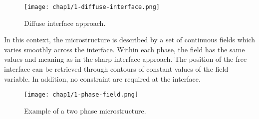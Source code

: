     \begin{figure}[H]
        \centering
        \texttt{[image: chap1/1-diffuse-interface.png]}
        \caption{Diffuse interface approach.}
        \label{fig:1-diffuse-interface}
    \end{figure}
    In this context, the microstructure is described by a set of continuous fields which varies smoothly across the interface. Within each phase, the field has the same values and meaning as in the sharp interface approach. The position of the free interface can be retrieved through contours of constant values of the field variable. In addition, no constraint are required at the interface.
    \begin{figure}[H]
        \centering
        \texttt{[image: chap1/1-phase-field.png]}
        \caption{Example of a two phase microstructure. \cite{LeeHuhJeongShinYunKim2014}}
        \label{fig:1-phase-field}
    \end{figure}
